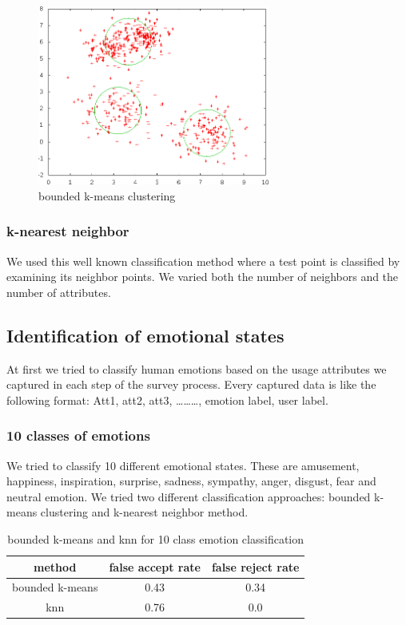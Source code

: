 \begin{figure}
\centering
\includegraphics[width=3in,clip,keepaspectratio]{Chapters/figures/boundeKmeans}
\caption{bounded k-means clustering}
\label{Optional 4 }
\end{figure}

\subsubsection{k-nearest neighbor}
We used this well known classification method where a test point is classified by examining its neighbor points. We varied both the number of neighbors and the number of attributes.

\subsection{Identification of emotional states}
At first we tried to classify human emotions based on the usage attributes we captured in each step of the survey process. Every captured data is like the following format:
Att1, att2, att3, ………, emotion label, user label.

\subsubsection{10 classes of emotions}
We tried to classify 10 different emotional states. These are amusement, happiness, inspiration, surprise, sadness, sympathy, anger, disgust, fear and neutral emotion.
We tried two different classification approaches: bounded k-means clustering and k-nearest neighbor method.
\begin{center}
\begin{table}

\centering
\begin{tabular}{ |c|c|c| } 
 \hline
 method & false accept rate & false reject rate \\ 
 \hline
 bounded k-means & 0.43 & 0.34 \\ 
 knn & 0.76 & 0.0 \\ 
 \hline
\end{tabular}

\caption{bounded k-means and knn for 10 class emotion classification}
\label{table:1}
\end{table}
\end{center}

